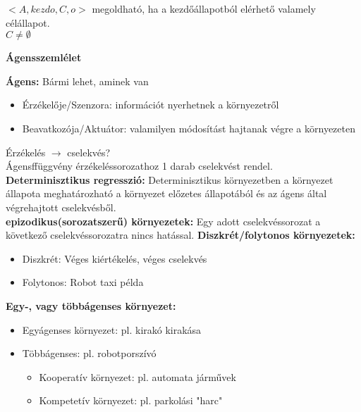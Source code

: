 \documentclass[a4paper, 12pt, fullpage]{article}
\begin{document}
    $<A, kezdo, C, o>$ megoldható, ha a kezdőállapotból elérhető valamely célállapot.\\
    $C \neq \emptyset$\\
    \begin{center}
        \Large{\textbf{Ágensszemlélet}}
    \end{center}
    \textbf{Ágens:} Bármi lehet, aminek van \begin{itemize}
        \item Érzékelője/Szenzora: információt nyerhetnek a környezetről
        \item Beavatkozója/Aktuátor: valamilyen módosítást hajtanak végre a környezeten
    \end{itemize}
    Érzékelés $\longrightarrow$ cselekvés?\\
    Ágensffüggvény érzékeléssorozathoz 1 darab cselekvést rendel.\\
    \textbf{Determinisztikus regresszió:} Determinisztikus környezetben a környezet állapota meghatározható a környezet előzetes állapotából és az ágens által végrehajtott cselekvésből.\\
    \textbf{epizodikus(sorozatszerű) környezetek:} Egy adott cselekvéssorozat a következő cselekvéssorozatra nincs hatással.
    \textbf{Diszkrét/folytonos környezetek:}
    \begin{itemize}
        \item Diszkrét: Véges kiértékelés, véges cselekvés
        \item Folytonos: Robot taxi példa
    \end{itemize}
    \textbf{Egy-, vagy többágenses környezet:}
    \begin{itemize}
        \item Egyágenses környezet: pl. kirakó kirakása
        \item Többágenses: pl. robotporszívó\begin{itemize}
            \item Kooperatív környezet: pl. automata járművek
            \item Kompetetív környezet: pl. parkolási "harc"
        \end{itemize}
    \end{itemize}
\end{document}
